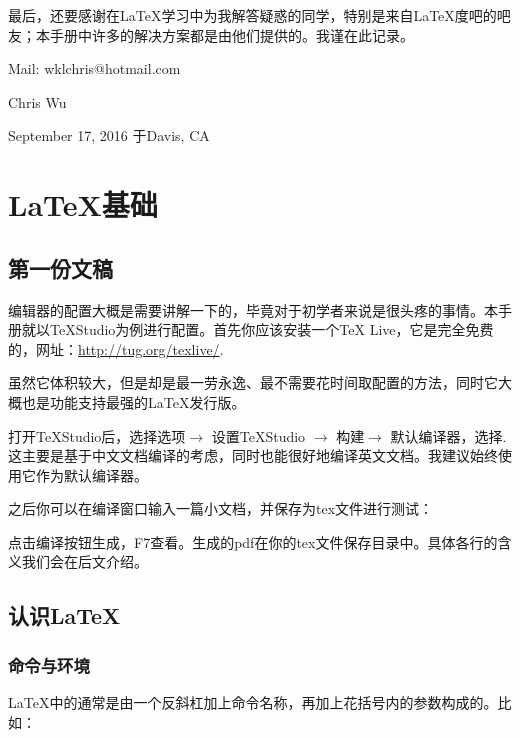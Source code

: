 最后，还要感谢在\LaTeX 学习中为我解答疑惑的同学，特别是来自\LaTeX 度吧的吧友；本手册中许多的解决方案都是由他们提供的。我谨在此记录。

\vfill

\begin{flushright}
Mail: wklchris@hotmail.com\dpar

Chris Wu

September 17, 2016 于Davis, CA
\end{flushright}



\chapter{\LaTeX{}基础}
\section{第一份文稿}

编辑器的配置大概是需要讲解一下的，毕竟对于初学者来说是很头疼的事情。本手册就以\TeX Studio为例进行配置。首先你应该安装一个\TeX{} Live，它是完全免费的，网址：\url{http://tug.org/texlive/}. 

虽然它体积较大，但是却是最一劳永逸、最不需要花时间取配置的方法，同时它大概也是功能支持最强的\LaTeX 发行版。

打开\TeX Studio后，选择选项$\rightarrow$ 设置\TeX Studio $\rightarrow$ 构建$\rightarrow$ 默认编译器，选择\xelatex{}. 这主要是基于中文文档编译的考虑，同时\xelatex 也能很好地编译英文文档。我建议始终使用它作为默认编译器。\dpar

之后你可以在编译窗口输入一篇小文档，并保存为tex文件进行测试：

点击编译按钮生成，F7查看。生成的pdf在你的tex文件保存目录中。具体各行的含义我们会在后文介绍。

\section{认识\LaTeX}
\subsection{命令与环境}
\LaTeX 中的通常是由一个反斜杠加上命令名称，再加上花括号内的参数构成的。比如：

